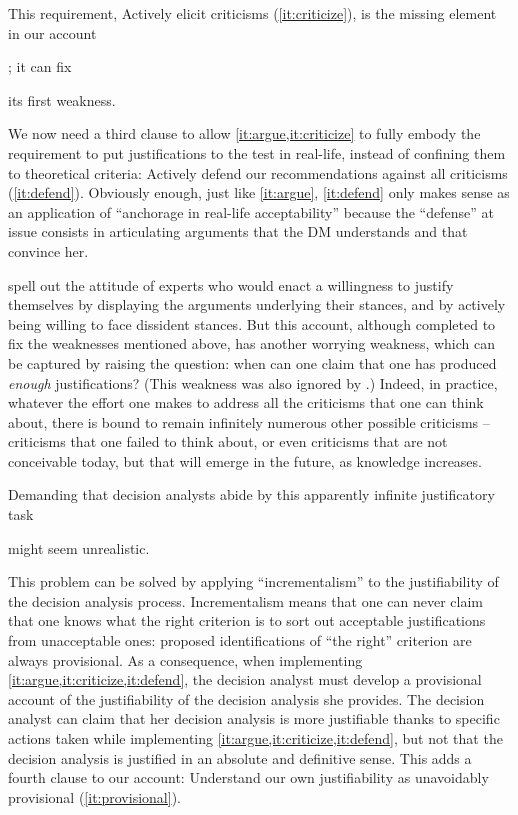 \documentclass[preprint, french, english, 11pt, authoryear]{elsarticle}%
\newcommand{\ac}[1]{#1}
\begin{document}
This requirement, Actively elicit criticisms (\ref{it:criticize}), is the missing element in our account\begin{changebar}; it can fix\end{changebar} its first weakness.

We now need a third clause to allow \cref{it:argue,it:criticize} to fully embody the requirement to put justifications to the test in real-life, instead of confining them to theoretical criteria: Actively defend our recommendations against all criticisms (\ref{it:defend}).
Obviously enough, just like \cref{it:argue}, \cref{it:defend} only makes sense as an application of ``anchorage in real-life acceptability'' because the ``defense'' at issue consists in articulating arguments that the \ac{DM} understands and that convince her.

 spell out the attitude of experts who would enact a willingness to justify themselves by displaying the arguments underlying their stances, and by actively being willing to face dissident stances. 
But this account, although completed to fix the weaknesses mentioned above, has another worrying weakness, which can be captured by raising the question: when can one claim that one has produced \emph{enough} justifications? (This weakness was also ignored by  \citet{meinard_what_2017}.) 
Indeed, in practice, whatever the effort one makes to address all the criticisms that one can think about, there is bound to remain infinitely numerous other possible criticisms -- criticisms that one failed to think about, or even criticisms that are not conceivable today, but that will emerge in the future, as knowledge increases. 
\begin{changebar}Demanding that decision analysts abide by this apparently infinite justificatory task\end{changebar} might seem unrealistic.

This problem can be solved by applying ``incrementalism'' to the justifiability of the decision analysis process. 
Incrementalism means that one can never claim that one knows what the right criterion is to sort out acceptable justifications from unacceptable ones: proposed identifications of ``the right'' criterion are always provisional. 
As a consequence, when implementing \cref{it:argue,it:criticize,it:defend}, the decision analyst must develop a provisional account of the justifiability of the decision analysis she provides. 
The decision analyst can claim that her decision analysis is more justifiable thanks to specific actions taken while implementing \cref{it:argue,it:criticize,it:defend}, but not that the decision analysis is justified in an absolute and definitive sense. 
This adds a fourth clause to our account: Understand our own justifiability as unavoidably provisional (\ref{it:provisional}).
\end{document}

